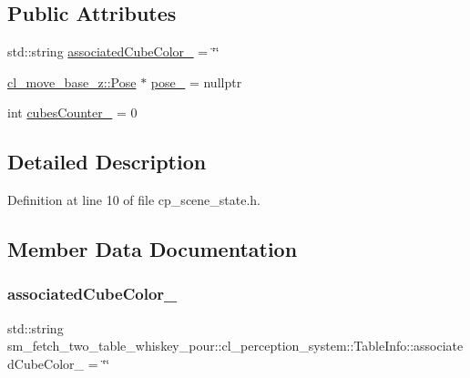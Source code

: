 \subsection*{Public Attributes}
\begin{DoxyCompactItemize}
\item 
std\+::string \hyperlink{structsm__fetch__two__table__whiskey__pour_1_1cl__perception__system_1_1TableInfo_a707c601a7bbbf69d4f04dbd5c68d1591}{associated\+Cube\+Color\+\_\+} = \char`\"{}\char`\"{}
\item 
\hyperlink{classcl__move__base__z_1_1Pose}{cl\+\_\+move\+\_\+base\+\_\+z\+::\+Pose} $\ast$ \hyperlink{structsm__fetch__two__table__whiskey__pour_1_1cl__perception__system_1_1TableInfo_a452066a80442e095b68181540a0fdd42}{pose\+\_\+} = nullptr
\item 
int \hyperlink{structsm__fetch__two__table__whiskey__pour_1_1cl__perception__system_1_1TableInfo_ae87cee26226cc58bc8a04043540338bc}{cubes\+Counter\+\_\+} = 0
\end{DoxyCompactItemize}


\subsection{Detailed Description}


Definition at line 10 of file cp\+\_\+scene\+\_\+state.\+h.



\subsection{Member Data Documentation}
\mbox{\label{structsm__fetch__two__table__whiskey__pour_1_1cl__perception__system_1_1TableInfo_a707c601a7bbbf69d4f04dbd5c68d1591}} 
\subsubsection{\texorpdfstring{associated\+Cube\+Color\+\_\+}{associatedCubeColor\_}}
{\footnotesize\ttfamily std\+::string sm\+\_\+fetch\+\_\+two\+\_\+table\+\_\+whiskey\+\_\+pour\+::cl\+\_\+perception\+\_\+system\+::\+Table\+Info\+::associated\+Cube\+Color\+\_\+ = \char`\"{}\char`\"{}}



